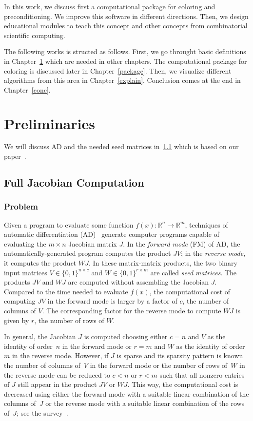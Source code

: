 \documentclass[12pt, oneside]{book}
\newcommand{\setR}{\ensuremath{\mathbb{R}}}
\newcommand{\col}{\ensuremath{c}}
\newcommand{\row}{\ensuremath{r}}
\begin{document}
In this work, we discuss first a computational package for coloring and preconditioning.
We improve this software in different directions. Then, we design educational modules
to teach this concept and other concepts from combinatorial scientific computing.

The following works is structed as follows.
First, we go throught basic definitions in Chapter~\ref{prel} which are needed in other chapters.
The computational package for coloring is discussed later in Chapter~\ref{package}.
Then, we visualize different algorithms from this area in Chapter~\ref{explain}.
Conclusion comes at the end in Chapter~\ref{conc}.


\chapter{Preliminaries}
\label{prel}
We will discuss AD and the needed seed matrices in~\ref{s.seedmatrix} which is based on
our paper~\cite{2014:09}.
\section{Full Jacobian Computation}
\label{s.seedmatrix}
\subsection{Problem}
Given a program to evaluate some function $f(x) : \setR^n \rightarrow \setR^m$,
techniques of automatic differentiation (AD)~\cite{Griewank2008EDP,Rall1981ADT} generate
computer programs capable of evaluating the $m \times n$ Jacobian matrix $J$. In the
\emph{forward mode} (FM) of AD, the automatically-generated program computes the product
$JV$; in the \emph{reverse mode}, it computes the product $WJ$. In these matrix-matrix
products, the two binary input matrices $V \in \{0,1\}^{n\times \col}$ and $W\in
\{0,1\}^{\row\times m}$ are called \emph{seed matrices}. The products $JV$ and $WJ$ are
computed without assembling the Jacobian $J$. Compared to the time needed to evaluate
$f(x)$, the computational cost of computing $JV$ in the forward mode is larger by a
factor of \col, the number of columns of $V$. The corresponding factor for the reverse
mode to compute $WJ$ is given by \row, the number of rows of $W$.

In general, the Jacobian $J$ is computed choosing either $c=n$ and $V$ as the identity of
order~$n$ in the forward mode or $r = m$ and $W$ as the identity of order $m$ in the
reverse mode. However, if $J$ is sparse and its sparsity pattern is known the number of
columns of~$V$ in the forward mode or the number of rows of~$W$ in the reverse mode can
be reduced to $\col < n$ or $\row < m$ such that all nonzero entries of $J$ still appear
in the product $JV$ or $WJ$. This way, the computational cost is decreased using either
the forward mode with a suitable linear combination of the columns of~$J$ or the reverse
mode with a suitable linear combination of the rows of~$J$; see the
survey~\cite{Gebremedhin05whatcolor}.
\end{document}
